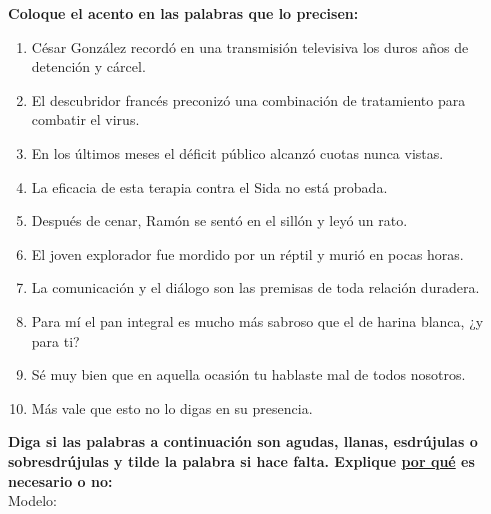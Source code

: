 \documentclass{article}
\begin{document}
\noindent \textbf{Coloque el acento en las palabras que lo precisen:}
\begin{enumerate}
	\item C\'esar Gonz\'alez record\'o en una transmisi\'on televisiva los duros años de detenci\'on y c\'arcel.
	\item El descubridor franc\'es preconiz\'o una combinaci\'on de tratamiento para combatir el virus.
	\item En los \'ultimos meses el d\'eficit p\'ublico alcanz\'o cuotas nunca vistas.
	\item La eficacia de esta terapia contra el Sida no est\'a probada.
	\item Despu\'es de cenar, Ram\'on se sent\'o en el sill\'on y ley\'o un rato.
	\item El joven explorador fue mordido por un r\'eptil y muri\'o en pocas horas.
	\item La comunicaci\'on y el di\'alogo son las premisas de toda relaci\'on duradera.
	\item Para m\'i el pan integral es mucho m\'as sabroso que el de harina blanca, ¿y para ti?
	\item S\'e muy bien que en aquella ocasi\'on tu hablaste mal de todos nosotros.
	\item M\'as vale que esto no lo digas en su presencia.
\end{enumerate}

\noindent \textbf{Diga si las palabras a continuación son agudas, llanas, esdrújulas o sobresdrújulas y tilde la palabra si hace falta. Explique \underline{por qué} es necesario o no:}\\

\noindent Modelo:\\
\end{document}
